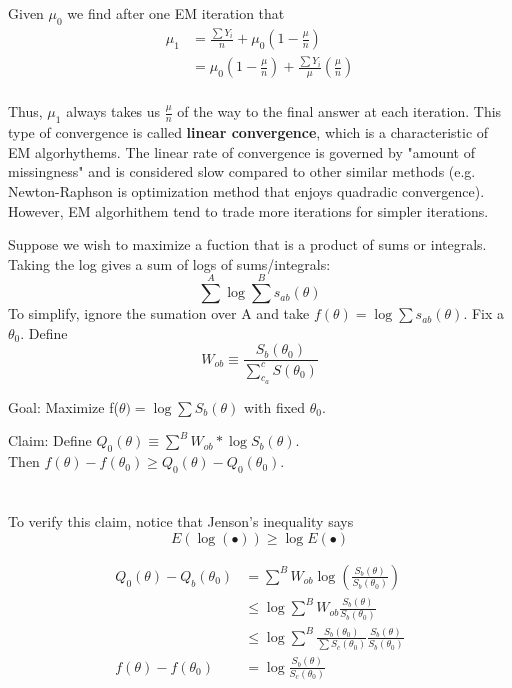 \documentclass[11pt,fleqn]{book} %
\begin{document}
Given $\mu_0$ we find after one EM iteration that
\begin{align*}
\mu_1 &=\frac{\sum Y_i}{n}+\mu_0(1-\frac{\mu}{n})\\
&= \mu_0(1-\frac{\mu}{n})+\frac{\sum Y_i}{\mu}(\frac{\mu}{n})\\
\end{align*}

Thus, $\mu_1$ always takes us $\frac{\mu}{n}$ of the way to the final answer at each iteration. This type of convergence is called \textbf{linear convergence}, which is a characteristic of EM algorhythems. The linear rate of convergence is governed by "amount of missingness" and is considered slow compared to other similar methods (e.g. Newton-Raphson is optimization method that enjoys quadradic convergence). However, EM algorhithem tend to trade more iterations for simpler iterations. 

Suppose we wish to maximize a fuction that is a product of sums or integrals. Taking the log gives a sum of logs of sums/integrals:
$$\sum^A\log\sum^B s_{ab}(\theta)$$ 
To simplify, ignore the sumation over A and take $f(\theta) = \log \sum s_{ab}(\theta)$. Fix a $\theta_0$. Define
$$W_{ob} \equiv \frac{S_b(\theta_0)}{\sum^c_{c_a} S(\theta_0)} $$ 

Goal: Maximize f($\theta)=\log \sum S_b(\theta)$ with fixed $\theta_0$.

Claim: Define $Q_0(\theta) \equiv \sum^B W_{ob} * \log S_b(\theta)$. \\
Then $f(\theta) -f(\theta_0) \ge Q_0(\theta) - Q_0(\theta_0)$. \\
\\
\\

To verify this claim, notice that Jenson's inequality says 
$$E(\log(\bullet)) \ge \log E(\bullet) $$

\begin{align*}
	Q_0(\theta)-Q_b(\theta_0)&= \sum^B W_{ob} \log(\frac{S_b(\theta)}{S_b(\theta_0)})\\
		&\le \log \sum^B W_{ob} \frac{S_b(\theta)}{S_b(\theta_0)}\\
		&\le \log \sum^B \frac{S_b(\theta_0)}{\sum S_c(\theta_0)} \frac{S_b(\theta)}{S_b(\theta_0)}\\
	f(\theta) - f(\theta_0) &= \log \frac{S_b(\theta)}{S_c(\theta_0)}	
\end{align*}
\end{document}
